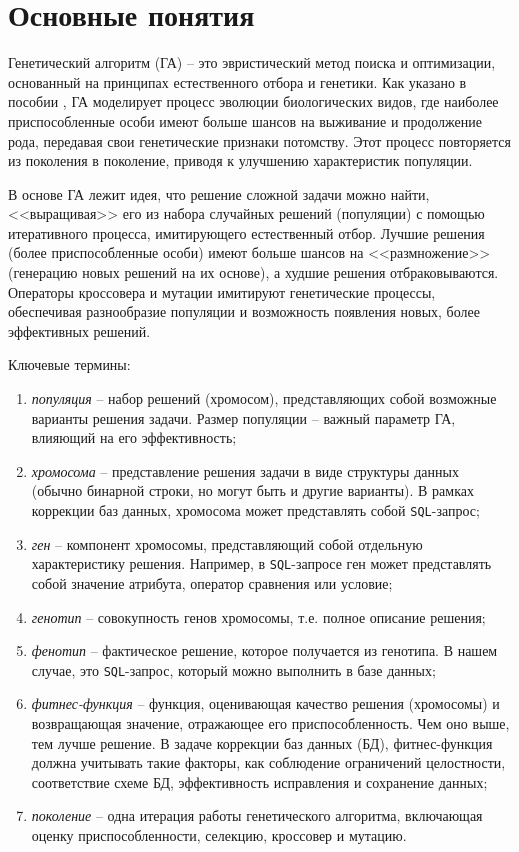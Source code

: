 \documentclass[master,paper]{pmk-graduate}
\begin{document}
\section{Основные понятия}
\label{sec11} 

Генетический алгоритм (ГА) – это эвристический метод поиска и оптимизации, основанный на принципах естественного отбора и генетики. Как указано в пособии \cite{bib1}, ГА моделирует процесс эволюции биологических видов, где наиболее приспособленные особи имеют больше шансов на выживание и продолжение рода, передавая свои генетические признаки потомству. Этот процесс повторяется из поколения в поколение, приводя к улучшению характеристик популяции.

В основе ГА лежит идея, что решение сложной задачи можно найти, <<выращивая>> его из набора случайных решений (популяции) с помощью итеративного процесса, имитирующего естественный отбор. Лучшие решения (более приспособленные особи) имеют больше шансов на <<размножение>> (генерацию новых решений на их основе), а худшие решения отбраковываются. Операторы кроссовера и мутации имитируют генетические процессы, обеспечивая разнообразие популяции и возможность появления новых, более эффективных решений.

Ключевые термины:
\begin{enumerate}
	\item \textit{популяция} -- набор решений (хромосом), представляющих собой возможные варианты решения задачи. Размер популяции – важный параметр ГА, влияющий на его эффективность;
	\item \textit{хромосома} -- представление решения задачи в виде структуры данных (обычно бинарной строки, но могут быть и другие варианты). В рамках коррекции баз данных, хромосома может представлять собой \texttt{SQL}-запрос;
	\item \textit{ген} -- компонент хромосомы, представляющий собой отдельную характеристику решения. Например, в \texttt{SQL}-запросе ген может представлять собой значение атрибута, оператор сравнения или условие;
	\item \textit{генотип} -- совокупность генов хромосомы, т.е. полное описание решения;
	\item \textit{фенотип} -- фактическое решение, которое получается из генотипа. В нашем случае, это \texttt{SQL}-запрос, который можно выполнить в базе данных;
	\item \textit{фитнес-функция} -- функция, оценивающая качество решения (хромосомы) и возвращающая значение, отражающее его приспособленность. Чем оно выше, тем лучше решение. В задаче коррекции баз данных (БД), фитнес-функция должна учитывать такие факторы, как соблюдение ограничений целостности, соответствие схеме БД, эффективность исправления и сохранение данных;
	\item \textit{поколение} -- одна итерация работы генетического алгоритма, включаю\-щая оценку приспособленности, селекцию, кроссовер и мутацию.
\end{enumerate}
\end{document}
